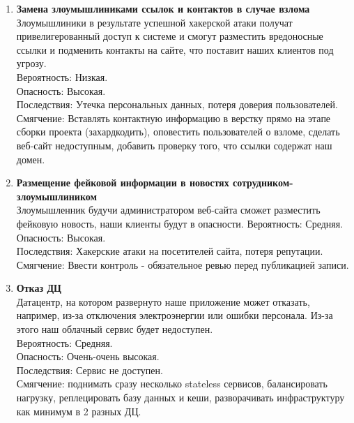 \begin{enumerate}
      \item \textbf{Замена злоумышлиниками ссылок и контактов в случае взлома} \\
            Злоумышлиники в результате успешной хакерской атаки получат привелигерованный
            доступ к системе и смогут разместить вредоносные ссылки и подменить контакты
            на сайте, что поставит наших клиентов под угрозу. \\
            Вероятность: Низкая. \\
            Опасность: Высокая. \\
            Последствия: Утечка персональных данных, потеря доверия пользователей. \\
            Смягчение: Вставлять контактную информацию в верстку прямо на этапе
            сборки проекта (захардкодить), оповестить пользователей о взломе,
            сделать веб-сайт недоступным, добавить проверку того, что ссылки содержат 
            наш домен.

      \item \textbf{Размещение фейковой информации в новостях сотрудником-злоумышлиником} \\
            Злоумышленник будучи администратором веб-сайта сможет разместить фейковую новость,
            наши клиенты будут в опасности.
            Вероятность: Средняя. \\
            Опасность: Высокая. \\
            Последствия: Хакерские атаки на посетителей сайта, потеря репутации. \\
            Смягчение: Ввести контроль - обязательное ревью перед публикацией записи. \\

      \item \textbf{Отказ ДЦ} \\
            Датацентр, на котором развернуто наше приложение может отказать, например,
            из-за отключения электроэнергии или ошибки персонала. Из-за этого наш облачный
            сервис будет недоступен. \\
            Вероятность: Средняя. \\
            Опасность: Очень-очень высокая. \\
            Последствия: Сервис не доступен. \\
            Смягчение: поднимать сразу несколько stateless сервисов,
            балансировать нагрузку, реплецировать базу данных и кеши,
            разворачивать инфраструктуру как минимум в 2 разных ДЦ.


\end{enumerate}
